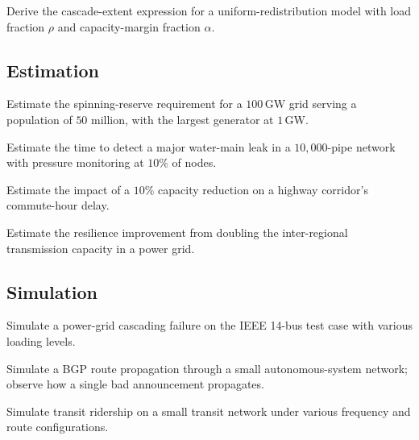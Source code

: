 \begin{exercise}
Derive the cascade-extent expression for a uniform-redistribution model with load fraction $\rho$ and capacity-margin fraction $\alpha$.
\end{exercise}

\subsection*{Estimation}

\begin{exercise}
Estimate the spinning-reserve requirement for a $100\,\text{GW}$ grid serving a population of $50$ million, with the largest generator at $1\,\text{GW}$.
\end{exercise}

\begin{exercise}
Estimate the time to detect a major water-main leak in a $10{,}000$-pipe network with pressure monitoring at $10\%$ of nodes.
\end{exercise}

\begin{exercise}
Estimate the impact of a $10\%$ capacity reduction on a highway corridor's commute-hour delay.
\end{exercise}

\begin{exercise}
Estimate the resilience improvement from doubling the inter-regional transmission capacity in a power grid.
\end{exercise}

\subsection*{Simulation}

\begin{exercise}
Simulate a power-grid cascading failure on the IEEE 14-bus test case with various loading levels.
\end{exercise}

\begin{exercise}
Simulate a BGP route propagation through a small autonomous-system network; observe how a single bad announcement propagates.
\end{exercise}

\begin{exercise}
Simulate transit ridership on a small transit network under various frequency and route configurations.
\end{exercise}

